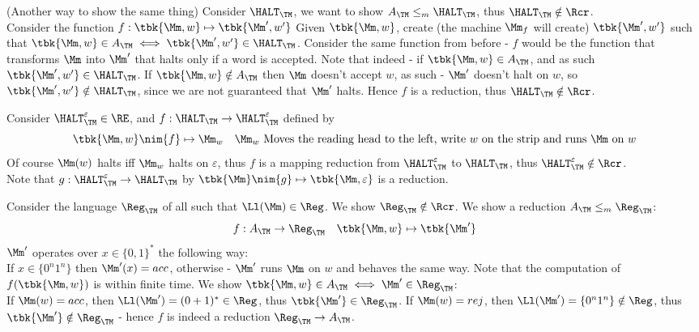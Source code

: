 \begin{example}
	(Another way to show the same thing) Consider $\HALT_{\TM}$, we want to show $A_{\TM}\leq_m \HALT_{\TM}$, thus $\HALT_{\TM}\notin \Rcr$. \\
	Consider the function $f:\tbk{\Mm,w}\mapsto\tbk{\Mm',w'}$ Given $\tbk{\Mm,w}$, create (the machine $\Mm_f$ will create) $\tbk{\Mm',w'}$ such that $\tbk{\Mm,w}\in A_{\TM} \iff \tbk{\Mm',w'}\in \HALT_{\TM}$. Consider the same function from before - $f$ would be the function that transforms $\Mm$ into $\Mm'$ that halts only if a word is accepted. Note that indeed - if $\tbk{\Mm,w}\in A_{\TM}$, and as such $\tbk{\Mm',w'}\in \HALT_{\TM}$. If $\tbk{\Mm,w}\notin A_{\TM}$ then $\Mm$ doesn't accept $w$, as such - $\Mm'$ doesn't halt on $w$, so $\tbk{\Mm',w'}\notin \HALT_{\TM}$, since we are not guaranteed that $\Mm'$ halts. Hence $f$ is a reduction, thus $\HALT_{\TM}\notin \Rcr$.
\end{example}
\begin{example}
	Consider $\HALT_{\TM}^\varepsilon \in \RE$, and $f:\HALT_{\TM}\to \HALT_{\TM}^\varepsilon$ defined by \[
	\tbk{\Mm,w}\nim{f}\mapsto \Mm_w \quad \Mm_w\text{ Moves the reading head to the left, write $w$ on the strip and runs $\Mm$ on $w$}
	\]
	Of course $\Mm(w)$ halts iff $\Mm_w$ halts on $\varepsilon$, thus $f$ is a mapping reduction from $\HALT_{\TM}^\varepsilon$ to $\HALT_{\TM}$, thus $\HALT_{\TM}^\varepsilon\notin \Rcr$.\\
	
	Note that $g:\HALT_{\TM}^\varepsilon \to \HALT_{\TM}$ by $\tbk{\Mm}\nim{g}\mapsto\tbk{\Mm,\varepsilon}$ is a reduction.
\end{example}
\begin{example}
	Consider the language $\Reg_{\TM}$ of all \TM such that $\Ll(\Mm)\in \Reg$. We show $\Reg_{\TM}\notin \Rcr$. We show a reduction $A_{\TM}\leq_m \Reg_{\TM}$:
	\[
	f:A_{\TM}\to \Reg_{\TM}\quad \tbk{\Mm,w}\mapsto \tbk{\Mm'}
	\]
	$\Mm'$ operates over $x\in \{0,1\}^*$ the following way:\\
	If $x\in \{0^n1^n\}$ then $\Mm'(x) = acc$, otherwise - $\Mm'$ runs $\Mm$ on $w$ and behaves the same way. Note that the computation of $f(\tbk{\Mm,w})$ is within finite time. We show $\tbk{\Mm,w}\in A_\TM \iff \Mm'\in \Reg_{\TM}$:\\
	If $\Mm(w) = acc$, then $\Ll(\Mm') = (0+1)^*\in \Reg$, thus $\tbk{\Mm'}\in \Reg_{\TM}$. If $\Mm(w) = rej$, then $\Ll(\Mm') = \{0^n1^n\}\notin \Reg$, thus $\tbk{\Mm'}\notin \Reg_{\TM}$ - hence $f$ is indeed a reduction $\Reg_{\TM}\to A_\TM$.
\end{example}
